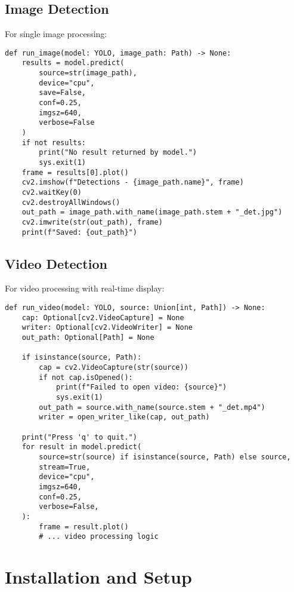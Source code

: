 \documentclass[12pt,a4paper]{article}
\begin{document}
\subsection{Image Detection}
For single image processing:

\begin{lstlisting}[caption=Image Detection Function]
def run_image(model: YOLO, image_path: Path) -> None:
    results = model.predict(
        source=str(image_path),
        device="cpu",
        save=False,
        conf=0.25,
        imgsz=640,
        verbose=False
    )
    if not results:
        print("No result returned by model.")
        sys.exit(1)
    frame = results[0].plot()
    cv2.imshow(f"Detections - {image_path.name}", frame)
    cv2.waitKey(0)
    cv2.destroyAllWindows()
    out_path = image_path.with_name(image_path.stem + "_det.jpg")
    cv2.imwrite(str(out_path), frame)
    print(f"Saved: {out_path}")
\end{lstlisting}

\subsection{Video Detection}
For video processing with real-time display:

\begin{lstlisting}[caption=Video Detection Function]
def run_video(model: YOLO, source: Union[int, Path]) -> None:
    cap: Optional[cv2.VideoCapture] = None
    writer: Optional[cv2.VideoWriter] = None
    out_path: Optional[Path] = None

    if isinstance(source, Path):
        cap = cv2.VideoCapture(str(source))
        if not cap.isOpened():
            print(f"Failed to open video: {source}")
            sys.exit(1)
        out_path = source.with_name(source.stem + "_det.mp4")
        writer = open_writer_like(cap, out_path)

    print("Press 'q' to quit.")
    for result in model.predict(
        source=str(source) if isinstance(source, Path) else source,
        stream=True,
        device="cpu",
        imgsz=640,
        conf=0.25,
        verbose=False,
    ):
        frame = result.plot()
        # ... video processing logic
\end{lstlisting}

\section{Installation and Setup}
\end{document}
